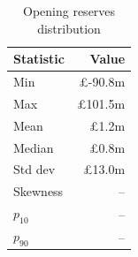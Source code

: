 \begin{table}[htbp]
\centering
\caption{Opening reserves distribution}
\label{tab:reserves_dist}
\begin{tabular}{lr}
\toprule
\textbf{Statistic} & \textbf{Value} \\
\midrule
Min & \pounds-90.8m \\
Max & \pounds101.5m \\
Mean & \pounds1.2m \\
Median & \pounds0.8m \\
Std dev & \pounds13.0m \\
Skewness & -- \\
$p_{10}$ & -- \\
$p_{90}$ & -- \\
\bottomrule
\end{tabular}
\end{table}
